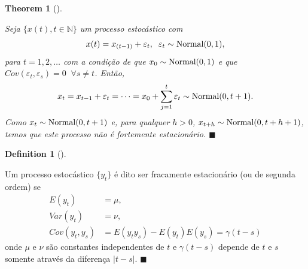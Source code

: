 \documentclass[
  letterpaper,
  DIV=11,
  numbers=noendperiod]{scrreprt}
\theoremstyle{plain}
\newtheorem{theorem}{Theorem}[chapter]
\theoremstyle{definition}
\newtheorem{definition}{Definition}[chapter]
\theoremstyle{definition}
\theoremstyle{remark}
\begin{document}
\begin{theorem}[]\protect\hypertarget{thm-exm_estacionaria2}{}\label{thm-exm_estacionaria2}

Seja \(\{x(t),t\in\mathbb{N}\}\) um processo estocástico com
\[x(t)= x_{(t-1)}+\varepsilon_t,\;\;\varepsilon_t\sim\hbox{Normal}(0,1),\]
para \(t=1,2,\ldots\) com a condição de que
\(x_0\sim\hbox{Normal}(0,1)\) e que
\(Cov(\varepsilon_t,\varepsilon_s)=0\;\;\forall s\neq t\). Então,
\[x_t=x_{t-1}+\varepsilon_{t}=\cdots=x_0+\sum_{j=1}^t\varepsilon_t\sim\hbox{Normal}(0,t+1).\]
Como \(x_t\sim\hbox{Normal}(0,t+1)\) e, para qualquer \(h>0\),
\(x_{t+h}\sim\hbox{Normal}(0,t+h+1)\), temos que este processo não é
fortemente estacionário. \(\blacksquare\)

\end{theorem}

\begin{definition}[]\protect\hypertarget{def-fracamente}{}\label{def-fracamente}

Um processo estocástico \(\{y_t\}\) é dito ser fracamente estacionário
(ou de segunda ordem) se \[\begin{align*}
    E(y_t)&=\mu,\\
    Var(y_t)&=\nu,\\ 
    Cov(y_t,y_s)&=E(y_ty_s)-E(y_t)E(y_s)=\gamma(t-s)
    \end{align*}\] onde \(\mu\) e \(\nu\) são constantes independentes
de \(t\) e \(\gamma(t-s)\) depende de \(t\) e \(s\) somente através da
diferença \(|t-s|\). \(\blacksquare\)

\end{definition}
\end{document}
